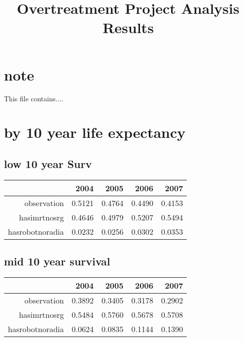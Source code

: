 \documentclass[12pt]{report}
\title{Overtreatment Project Analysis Results}
\date{}
\begin{document}
\maketitle
\thispagestyle{fancy}

\section*{note}
This file contains....

\section{by 10 year life expectancy}
\subsection{ low 10 year Surv}
\begin{table}[ht]
\begin{center}
\begin{tabular}{rrrrr}
  \hline
 & 2004 & 2005 & 2006 & 2007 \\ 
  \hline
observation & 0.5121 & 0.4764 & 0.4490 & 0.4153 \\ 
  hasimrtnosrg & 0.4646 & 0.4979 & 0.5207 & 0.5494 \\ 
  hasrobotnoradia & 0.0232 & 0.0256 & 0.0302 & 0.0353 \\ 
   \hline
\end{tabular}
\end{center}
\end{table}

\subsection{mid 10 year survival}
\begin{table}[ht]
\begin{center}
\begin{tabular}{rrrrr}
  \hline
 & 2004 & 2005 & 2006 & 2007 \\ 
  \hline
observation & 0.3892 & 0.3405 & 0.3178 & 0.2902 \\ 
  hasimrtnosrg & 0.5484 & 0.5760 & 0.5678 & 0.5708 \\ 
  hasrobotnoradia & 0.0624 & 0.0835 & 0.1144 & 0.1390 \\ 
   \hline
\end{tabular}
\end{center}
\end{table}
\end{document}
